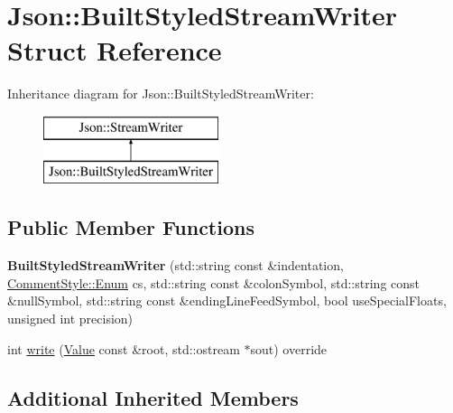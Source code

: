 \hypertarget{struct_json_1_1_built_styled_stream_writer}{\section{Json\-:\-:Built\-Styled\-Stream\-Writer Struct Reference}
\label{struct_json_1_1_built_styled_stream_writer}
}
Inheritance diagram for Json\-:\-:Built\-Styled\-Stream\-Writer\-:\begin{figure}[H]
\begin{center}
\leavevmode
\includegraphics[height=2.000000cm]{struct_json_1_1_built_styled_stream_writer}
\end{center}
\end{figure}
\subsection*{Public Member Functions}
\begin{DoxyCompactItemize}
\item 
\hypertarget{struct_json_1_1_built_styled_stream_writer_ab0c2e665c86b22f8fafb0e52c8069954}{{\bfseries Built\-Styled\-Stream\-Writer} (std\-::string const \&indentation, \hyperlink{struct_json_1_1_comment_style_a51fc08f3518fd81eba12f340d19a3d0c}{Comment\-Style\-::\-Enum} cs, std\-::string const \&colon\-Symbol, std\-::string const \&null\-Symbol, std\-::string const \&ending\-Line\-Feed\-Symbol, bool use\-Special\-Floats, unsigned int precision)}\label{struct_json_1_1_built_styled_stream_writer_ab0c2e665c86b22f8fafb0e52c8069954}

\item 
int \hyperlink{struct_json_1_1_built_styled_stream_writer_a2ecffc3d66c4feddf208e5cd3b1c0f18}{write} (\hyperlink{class_json_1_1_value}{Value} const \&root, std\-::ostream $\ast$sout) override
\end{DoxyCompactItemize}
\subsection*{Additional Inherited Members}



